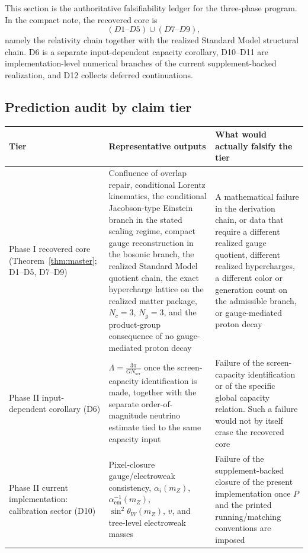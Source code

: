 \documentclass[11pt]{article}
\begin{document}
This section is the authoritative falsifiability ledger for the three-phase program. In the compact note, the recovered core is
\[
(D1\text{--}D5)\cup(D7\text{--}D9),
\]
namely the relativity chain together with the realized Standard Model structural chain. D6 is a separate input-dependent capacity corollary, D10--D11 are implementation-level numerical branches of the current supplement-backed realization, and D12 collects deferred continuations.

\subsection{Prediction audit by claim tier}

\begingroup
\footnotesize
\begin{longtable}{@{}>{\raggedright\arraybackslash}p{}>{\raggedright\arraybackslash}p{}>{\raggedright\arraybackslash}p{}@{}}
\toprule
Tier & Representative outputs & What would actually falsify the tier \\
\midrule
\endhead
\bottomrule
\endfoot
Phase I recovered core (Theorem~\ref{thm:master}; D1--D5, D7--D9) & Confluence of overlap repair, conditional Lorentz kinematics, the conditional Jacobson-type Einstein branch in the stated scaling regime, compact gauge reconstruction in the bosonic branch, the realized Standard Model quotient chain, the exact hypercharge lattice on the realized matter package, \(N_c=3\), \(N_g=3\), and the product-group consequence of no gauge-mediated proton decay & A mathematical failure in the derivation chain, or data that require a different realized gauge quotient, different realized hypercharges, a different color or generation count on the admissible branch, or gauge-mediated proton decay \\
Phase II input-dependent corollary (D6) & \(\Lambda=\frac{3\pi}{G N_{\mathrm{scr}}}\) once the screen-capacity identification is made, together with the separate order-of-magnitude neutrino estimate tied to the same capacity input & Failure of the screen-capacity identification or of the specific global capacity relation. Such a failure would not by itself erase the recovered core \\
Phase II current implementation: calibration sector (D10) & Pixel-closure gauge/electroweak consistency, \(\alpha_i(m_Z)\), \(\alpha_{\mathrm{em}}^{-1}(m_Z)\), \(\sin^2\theta_W(m_Z)\), \(v\), and tree-level electroweak masses & Failure of the supplement-backed closure of the present implementation once \(P\) and the printed running/matching conventions are imposed \\

\end{longtable}
\end{document}
